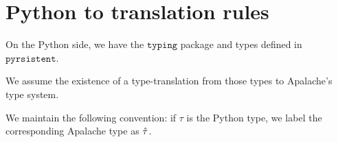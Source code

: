 \section{Python to \tlap{} translation rules}

On the Python side, we have the $\texttt{typing}$ package and types defined in $\texttt{pyrsistent}$. 

We assume the existence of a type-translation from those types to Apalache's type system.

We maintain the following convention: if $\tau$ is the Python type, we label the corresponding Apalache type as $\hat{\tau}$.



